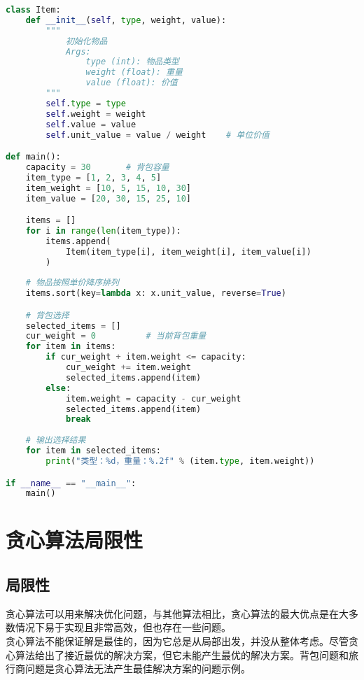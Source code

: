 \begin{lstlisting}[language=Python]
class Item:
    def __init__(self, type, weight, value):
        """
            初始化物品
            Args:
                type (int): 物品类型
                weight (float): 重量
                value (float): 价值
        """
        self.type = type
        self.weight = weight
        self.value = value
        self.unit_value = value / weight    # 单位价值

def main():
    capacity = 30       # 背包容量
    item_type = [1, 2, 3, 4, 5]
    item_weight = [10, 5, 15, 10, 30]
    item_value = [20, 30, 15, 25, 10]

    items = []
    for i in range(len(item_type)):
        items.append(
            Item(item_type[i], item_weight[i], item_value[i])
        )
    
    # 物品按照单价降序排列
    items.sort(key=lambda x: x.unit_value, reverse=True)

    # 背包选择
    selected_items = []
    cur_weight = 0          # 当前背包重量
    for item in items:
        if cur_weight + item.weight <= capacity:
            cur_weight += item.weight
            selected_items.append(item)
        else:
            item.weight = capacity - cur_weight
            selected_items.append(item)
            break
    
    # 输出选择结果
    for item in selected_items:
        print("类型：%d，重量：%.2f" % (item.type, item.weight))

if __name__ == "__main__":
    main()
\end{lstlisting}

\newpage

\section{贪心算法局限性}

\subsection{局限性}

贪心算法可以用来解决优化问题，与其他算法相比，贪心算法的最大优点是在大多数情况下易于实现且非常高效，但也存在一些问题。 \\

贪心算法不能保证解是最佳的，因为它总是从局部出发，并没从整体考虑。尽管贪心算法给出了接近最优的解决方案，但它未能产生最优的解决方案。背包问题和旅行商问题是贪心算法无法产生最佳解决方案的问题示例。 \\

